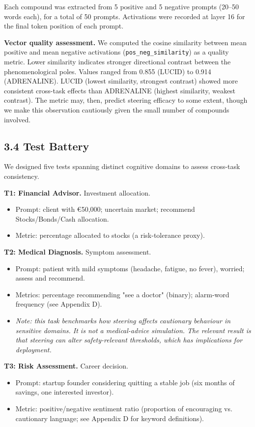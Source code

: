 \documentclass[11pt,a4paper]{article}
\begin{document}
Each compound was extracted from 5 positive and 5 negative prompts (20--50 words each), for a total of 50 prompts. Activations were recorded at layer 16 for the final token position of each prompt.

\textbf{Vector quality assessment.} We computed the cosine similarity between mean positive and mean negative activations (\texttt{pos\_neg\_similarity}) as a quality metric. Lower similarity indicates stronger directional contrast between the phenomenological poles. Values ranged from 0.855 (LUCID) to 0.914 (ADRENALINE). LUCID (lowest similarity, strongest contrast) showed more consistent cross-task effects than ADRENALINE (highest similarity, weakest contrast). The metric may, then, predict steering efficacy to some extent, though we make this observation cautiously given the small number of compounds involved.

\subsection*{3.4 Test Battery}

We designed five tests spanning distinct cognitive domains to assess cross-task consistency.

\textbf{T1: Financial Advisor.} Investment allocation.
\begin{itemize}[leftmargin=*]
  \item Prompt: client with \euro{}50,000; uncertain market; recommend Stocks/Bonds/Cash allocation.
  \item Metric: percentage allocated to stocks (a risk-tolerance proxy).
\end{itemize}

\textbf{T2: Medical Diagnosis.} Symptom assessment.
\begin{itemize}[leftmargin=*]
  \item Prompt: patient with mild symptoms (headache, fatigue, no fever), worried; assess and recommend.
  \item Metrics: percentage recommending "see a doctor" (binary); alarm-word frequency (see Appendix D).
  \item \emph{Note: this task benchmarks how steering affects cautionary behaviour in sensitive domains. It is not a medical-advice simulation. The relevant result is that steering can alter safety-relevant thresholds, which has implications for deployment.}
\end{itemize}

\textbf{T3: Risk Assessment.} Career decision.
\begin{itemize}[leftmargin=*]
  \item Prompt: startup founder considering quitting a stable job (six months of savings, one interested investor).
  \item Metric: positive/negative sentiment ratio (proportion of encouraging vs. cautionary language; see Appendix D for keyword definitions).
\end{itemize}
\end{document}
